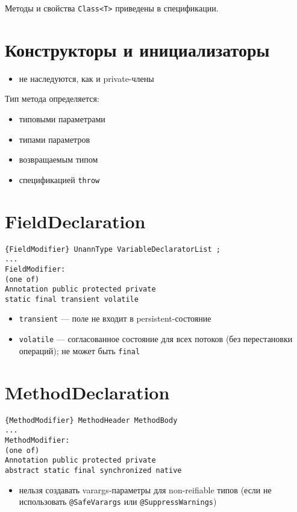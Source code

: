 \documentclass[a4paper,12pt]{article}
\begin{document}
\noindent Методы и свойства \texttt{Class<T>} приведены в спецификации.

\section*{Конструкторы и инициализаторы}
\begin{itemize}
  \item не наследуются, как и private-члены
\end{itemize}

Тип метода определяется:
\begin{itemize}
  \item типовыми параметрами
  \item типами параметров
  \item возвращаемым типом
  \item спецификацией \texttt{throw}
\end{itemize}

\section*{FieldDeclaration}
\begin{verbatim}
{FieldModifier} UnannType VariableDeclaratorList ;
...
FieldModifier:
(one of)
Annotation public protected private
static final transient volatile
\end{verbatim}

\begin{itemize}
  \item \texttt{transient} — поле не входит в persistent-состояние
  \item \texttt{volatile} — согласованное состояние для всех потоков (без перестановки операций); не может быть \texttt{final}
\end{itemize}

\section*{MethodDeclaration}
\begin{verbatim}
{MethodModifier} MethodHeader MethodBody
...
MethodModifier:
(one of)
Annotation public protected private
abstract static final synchronized native
\end{verbatim}

\begin{itemize}
  \item нельзя создавать varargs-параметры для non-reifiable типов (если не использовать \texttt{@SafeVarargs} или \texttt{@SuppressWarnings})
\end{itemize}
\end{document}
